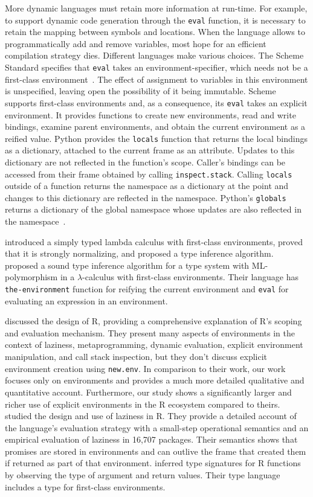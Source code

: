 \documentclass[10pt,review,sigplan,authorversion=true]{acmart}
\newcommand{\code}[1]{\lstinline |#1|\xspace}
\renewcommand{\c}[1]{\lstinline |#1|\xspace}
\begin{document}
More dynamic languages must retain more information at run-time. For example, to
support dynamic code generation through the \c{eval} function, it is necessary
to retain the mapping between symbols and locations. When the language allows to
programmatically add and remove variables, most hope for an efficient
compilation strategy dies. Different languages make various choices. The Scheme
Standard specifies that \code{eval} takes an environment-specifier, which needs
not be a first-class environment~\cite{SchemeR5RS}. The effect of assignment to
variables in this environment is unspecified, leaving open the possibility of it
being immutable. Scheme supports first-class environments and, as a consequence,
its \code{eval} takes an explicit environment. It provides functions to create
new environments, read and write bindings, examine parent environments, and
obtain the current environment as a reified value. Python provides the
\code{locals} function that returns the local bindings as a dictionary, attached
to the current frame as an attribute. Updates to this dictionary are not
reflected in the function's scope. Caller's bindings can be accessed from their
frame obtained by calling \code{inspect.stack}. Calling \code{locals} outside of
a function returns the namespace as a dictionary at the point and changes to
this dictionary are reflected in the namespace. Python's \code{globals} returns
a dictionary of the global namespace whose updates are also reflected in the
namespace~\cite{}.

\citet{NishizakiSTLC94} introduced a simply typed lambda calculus with
first-class environments, proved that it is strongly normalizing, and proposed a
type inference algorithm. \citet{NishizakiML94} proposed a sound type inference
algorithm for a type system with ML-polymorphism in a $\lambda$-calculus with
first-class environments. Their language has \c{the-environment} function for
reifying the current environment and \c{eval} for evaluating an expression in an
environment.

\citet{ecoop12} discussed the design of R, providing a comprehensive explanation
of R's scoping and evaluation mechanism. They present many aspects of
environments in the context of laziness, metaprogramming, dynamic evaluation,
explicit environment manipulation, and call stack inspection, but they don't
discuss explicit environment creation using \code{new.env}. In comparison to
their work, our work focuses only on environments and provides a much more
detailed qualitative and quantitative account. Furthermore, our study shows a
significantly larger and richer use of explicit environments in the R ecosystem
compared to theirs. \citet{oopsla19b} studied the design and use of laziness in
R. They provide a detailed account of the language’s evaluation strategy with a
small-step operational semantics and an empirical evaluation of laziness in
16,707 packages. Their semantics shows that promises are stored in environments
and can outlive the frame that created them if returned as part of that
environment. \citet{oopsla20b} inferred type signatures for R functions by
observing the type of argument and return values. Their type language includes a
type for first-class environments.
\end{document}
